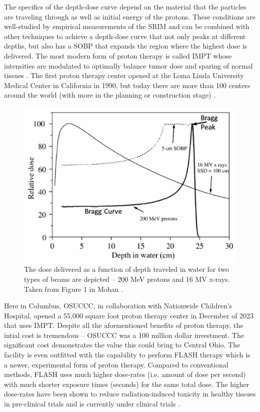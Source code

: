 The specifics of the depth-dose curve depend on the material that the particles are traveling through as well as initial energy of the protons. These conditions are well-studied by empirical measurements of the \gls{SRIM} \cite{Ziegler_2010_SRIM} and can be combined with other techniques to achieve a depth-dose curve that not only peaks at different depths, but also has a \gls{SOBP} that expands the region where the highest dose is delivered. The most modern form of proton therapy is called \gls{IMPT} whose intensities are modulated to optimally balance tumor dose and sparing of normal tissues \cite{Mohan_2022_PRO}. The first proton therapy center opened at the Loma Linda University Medical Center in California in 1990, but today there are more than 100 centers around the world (with more in the planning or construction stage) \cite{Mohan_2022_PRO}. 

\begin{figure}
	\centering
	\includegraphics[width=0.75\linewidth]{planning/images/bragg_curve.PNG}
	\caption{The dose delivered as a function of depth traveled in water for two types of beams are depicted -- 200 MeV protons and 16 MV x-rays. Taken from Figure 1 in Mohan \cite{Mohan_2022_PRO}.}
	\label{fig:bragg_curve}
\end{figure}
 
Here in Columbus, \gls{OSUCCC}, in collaboration with Nationwide Children's Hospital, opened a 55,000 square foot proton therapy center in December of 2023 \cite{OSU_CCC} that uses \gls{IMPT}. Despite all the aformentioned benefits of proton therapy, the intial cost is tremendous -- \gls{OSUCCC} was a 100 million dollar investment. The significant cost demonstrates the value this could bring to Central Ohio. The facility is even outfitted with the capability to perform FLASH therapy which is a newer, experimental form of proton therapy. Compared to conventional methods, FLASH uses much higher dose-rates (i.e. amount of dose per second) with much shorter exposure times (seconds) for the same total dose. The higher dose-rates have been shown to reduce radiation-induced toxicity in healthy tissues in pre-clinical trials \cite{Matuszak_2022_Onc} and is currently under clinical trials \cite{OSU_CCC}. 

